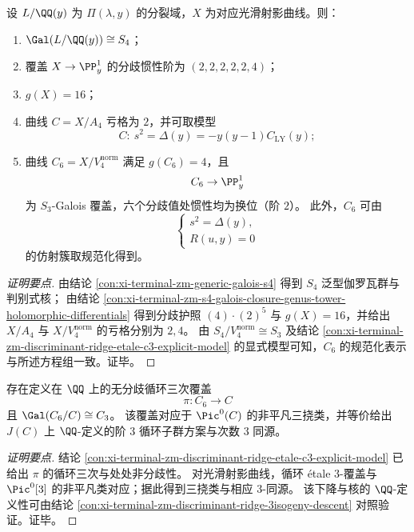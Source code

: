 \begin{conclusion}\label{con:xi-terminal-zm-s4-closure-passport-genus-spectrum-restated}
设 \(L/\QQ(y)\) 为 \(\Pi(\lambda,y)\) 的分裂域，\(X\) 为对应光滑射影曲线。则：
\begin{enumerate}
  \item \(\Gal(L/\QQ(y))\cong S_4\)；
  \item 覆盖 \(X\to\PP^1_y\) 的分歧惯性阶为 \((2,2,2,2,2,4)\)；
  \item \(g(X)=16\)；
  \item 曲线 \(C=X/A_4\) 亏格为 \(2\)，并可取模型
  \[
  C:\ s^2=\Delta(y)=-y(y-1)C_{\mathrm{LY}}(y);
  \]
  \item 曲线 \(C_6=X/V_4^{\mathrm{norm}}\) 满足 \(g(C_6)=4\)，且
  \[
  C_6\to \PP^1_y
  \]
  为 \(S_3\)-Galois 覆盖，六个分歧值处惯性均为换位（阶 \(2\)）。
  此外，\(C_6\) 可由
  \[
  \begin{cases}
  s^2=\Delta(y),\\
  R(u,y)=0
  \end{cases}
  \]
  的仿射簇取规范化得到。
\end{enumerate}
\end{conclusion}
\begin{proof}[证明要点]
由结论 \ref{con:xi-terminal-zm-generic-galois-s4} 得到 \(S_4\) 泛型伽罗瓦群与判别式核；
由结论 \ref{con:xi-terminal-zm-s4-galois-closure-genus-tower-holomorphic-differentials} 得到分歧护照 \((4)\cdot(2)^5\) 与 \(g(X)=16\)，并给出 \(X/A_4\) 与 \(X/V_4^{\mathrm{norm}}\) 的亏格分别为 \(2,4\)。
由 \(S_4/V_4^{\mathrm{norm}}\cong S_3\) 及结论 \ref{con:xi-terminal-zm-discriminant-ridge-etale-c3-explicit-model} 的显式模型可知，\(C_6\) 的规范化表示与所述方程组一致。证毕。
\end{proof}

\begin{conclusion}\label{con:xi-terminal-zm-c6-over-c-etale-c3-pic3-class}
存在定义在 \(\QQ\) 上的无分歧循环三次覆盖
\[
\pi:C_6\longrightarrow C
\]
且 \(\Gal(C_6/C)\cong C_3\)。
该覆盖对应于 \(\Pic^0(C)\) 的非平凡三挠类，并等价给出 \(J(C)\) 上 \(\QQ\)-定义的阶 \(3\) 循环子群方案与次数 \(3\) 同源。
\end{conclusion}
\begin{proof}[证明要点]
结论 \ref{con:xi-terminal-zm-discriminant-ridge-etale-c3-explicit-model} 已给出 \(\pi\) 的循环三次与处处非分歧性。
对光滑射影曲线，循环 \'{e}tale \(3\)-覆盖与 \(\Pic^0[3]\) 的非平凡类对应；据此得到三挠类与相应 \(3\)-同源。
该下降与核的 \(\QQ\)-定义性可由结论 \ref{con:xi-terminal-zm-discriminant-ridge-3isogeny-descent} 对照验证。证毕。
\end{proof}

